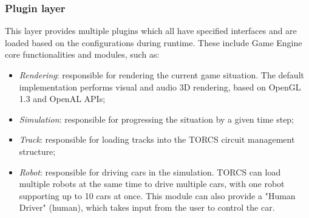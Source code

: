\subsubsection{Plugin layer}
This layer provides multiple plugins which all have specified interfaces and are loaded based on the configurations during runtime. These include Game Engine core functionalities and modules, such as:
\begin{itemize}
	\item \textit{Rendering}: responsible for rendering the current game situation. The default implementation performs visual and audio 3D rendering, based on OpenGL 1.3 and OpenAL APIs;
	\item \textit{Simulation}: responsible for progressing the situation by a given time step;
	\item \textit{Track}: responsible for loading tracks into the TORCS circuit management structure;
	\item \textit{Robot}: responsible for driving cars in the simulation. TORCS can load multiple robots at the same time to drive multiple cars, with one robot supporting up to 10 cars at once. This module can also provide a "Human Driver" (human), which takes input from the user to control the car.
\end{itemize}

